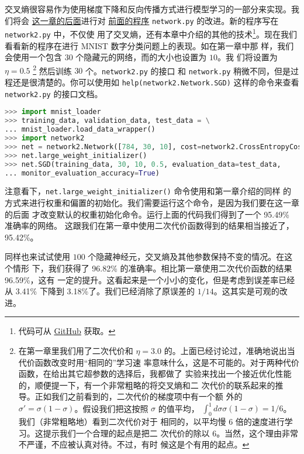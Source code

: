 交叉熵很容易作为使用梯度下降和反向传播方式进行模型学习的一部分来实现。我们将会%
\hyperref[sec:handwriting_recognition_revisited_the_code]{这一章的后面}进行对
\hyperref[sec:implementing_our_network_to_classify_digits]{前面的程序}
\lstinline!network.py! 的改进。新的程序写在 \lstinline!network2.py!  中，不仅使
用了交叉熵，还有本章中介绍的其他的技术\footnote{代码可从
  \href{https://github.com/mnielsen/neural-networks-and-deep-learning/blob/master/src/network2.py}{GitHub}
  获取。}。现在我们看看新的程序在进行 MNIST 数字分类问题上的表现。如在第一章中那
样，我们会使用一个包含 $30$ 个隐藏元的网络，而\minibatch{}的大小也设置为 $10$。我
们将\learningrate{}设置为 $\eta=0.5$ \footnote{在第一章里我们用了二次代价和 $\eta =
  3.0$ 的\learningrate{}。上面已经讨论过，准确地说出当代价函数改变时用“相同的”学习速
  率意味什么，这是不可能的。对于两种代价函数，在给出其它超参数的选择后，我都做了
  实验来找出一个接近优化性能的\learningrate{}，顺便提一下，有一个非常粗略的将交叉熵和二
  次代价的\learningrate{}联系起来的推导。正如我们之前看到的，二次代价的梯度项中有一个额
  外的 $\sigma' = \sigma(1-\sigma)$。假设我们把这按照 $\sigma$ 的值平均，
  $\int_0^1 d\sigma \sigma(1-\sigma) = 1/6$。我们（非常粗略地）看到二次代价对于
  相同的\learningrate{}，以平均慢 $6$ 倍的速度进行学习。这提示我们一个合理的起点是把二
  次代价的\learningrate{}除以 $6$。当然，这个理由非常不严谨，不应被认真对待。不过，有时
  候这是个有用的起点。} 然后训练 $30$ 个\epochs{}。\lstinline!network2.py! 的接口
和 \lstinline!network.py! 稍微不同，但是过程还是很清楚的。你可以使用如
\lstinline!help(network2.Network.SGD)! 这样的命令来查看 \lstinline!network2.py!
的接口文档。

\begin{lstlisting}[language=Python]
>>> import mnist_loader
>>> training_data, validation_data, test_data = \
... mnist_loader.load_data_wrapper()
>>> import network2
>>> net = network2.Network([784, 30, 10], cost=network2.CrossEntropyCost)
>>> net.large_weight_initializer()
>>> net.SGD(training_data, 30, 10, 0.5, evaluation_data=test_data,
... monitor_evaluation_accuracy=True)
\end{lstlisting}

注意看下，\lstinline!net.large_weight_initializer()! 命令使用和第一章介绍的同样
的方式来进行权重和偏置的初始化。我们需要运行这个命令，是因为我们要在这一章的后面
才改变默认的权重初始化命令。运行上面的代码我们得到了一个 95.49\% 准确率的网络。
这跟我们在第一章中使用二次代价函数得到的结果相当接近了，95.42\%。

同样也来试试使用 $100$ 个隐藏神经元，交叉熵及其他参数保持不变的情况。在这个情形
下，我们获得了 96.82\% 的准确率。相比第一章使用二次代价函数的结果 96.59\%，这有
一定的提升。这看起来是一个小小的变化，但是考虑到误差率已经从 3.41\% 下降到
3.18\%了。我们已经消除了原误差的 $1/14$。这其实是可观的改进。

